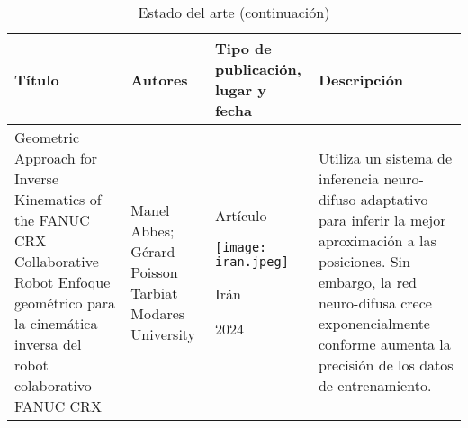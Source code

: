 \newpage
\begin{table}[htb]
	\caption{Estado del arte (continuación)}
	\centering
	\begin{tabular}{p{5cm}p{4cm}p{3.6cm}p{4cm}}
		\textbf{Título} & \textbf{Autores} & \textbf{Tipo de publicación, lugar y fecha} & \textbf{Descripción} \\ 
		\midrule
		Geometric Approach for Inverse Kinematics of the FANUC CRX Collaborative Robot \cite{estado3} \newline\newline
		Enfoque geométrico para la cinemática inversa del robot colaborativo FANUC CRX &  
		Manel Abbes; Gérard Poisson \newline\newline 
		Tarbiat Modares University & 
		\begin{center}Artículo \par \texttt{[image: iran.jpeg]} \par Irán \par 2024\end{center} & 
		Utiliza un sistema de inferencia neuro-difuso adaptativo para inferir la mejor aproximación a las posiciones. \newline\newline Sin embargo, la red neuro-difusa crece exponencialmente conforme aumenta la precisión de los datos de entrenamiento. \\
	\end{tabular}
\end{table}